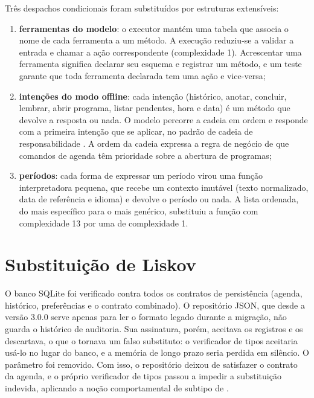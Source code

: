 Três despachos condicionais foram substituídos por estruturas extensíveis:

\begin{enumerate}[label=\alph*)]
  \item \textbf{ferramentas do modelo}: o executor mantém uma tabela que associa o nome de cada
        ferramenta a um método. A execução reduziu-se a validar a entrada e chamar a ação correspondente
        (complexidade 1). Acrescentar uma ferramenta significa declarar seu esquema e registrar um método,
        e um teste garante que toda ferramenta declarada tem uma ação e vice-versa;
  \item \textbf{intenções do modo offline}: cada intenção (histórico, anotar, concluir, lembrar, abrir
        programa, listar pendentes, hora e data) é um método que devolve a resposta ou nada. O modelo
        percorre a cadeia em ordem e responde com a primeira intenção que se aplicar, no padrão de cadeia
        de responsabilidade \cite{gamma1994}. A ordem da cadeia expressa a regra de negócio de que comandos
        de agenda têm prioridade sobre a abertura de programas;
  \item \textbf{períodos}: cada forma de expressar um período virou uma função interpretadora pequena,
        que recebe um contexto imutável (texto normalizado, data de referência e idioma) e devolve o
        período ou nada. A lista ordenada, do mais específico para o mais genérico, substituiu a função
        com complexidade 13 por uma de complexidade 1.
\end{enumerate}

\section{Substituição de Liskov}

O banco SQLite foi verificado contra todos os contratos de persistência (agenda, histórico,
preferências e o contrato combinado). O repositório JSON, que desde a versão 3.0.0 serve apenas para
ler o formato legado durante a migração, não guarda o histórico de auditoria. Sua assinatura, porém,
aceitava os registros e os descartava, o que o tornava um falso substituto: o verificador de tipos
aceitaria usá-lo no lugar do banco, e a memória de longo prazo seria perdida em silêncio. O parâmetro foi
removido. Com isso, o repositório deixou de satisfazer o contrato da agenda, e o próprio verificador de
tipos passou a impedir a substituição indevida, aplicando a noção comportamental de subtipo de
\textcite{liskov1994}.

